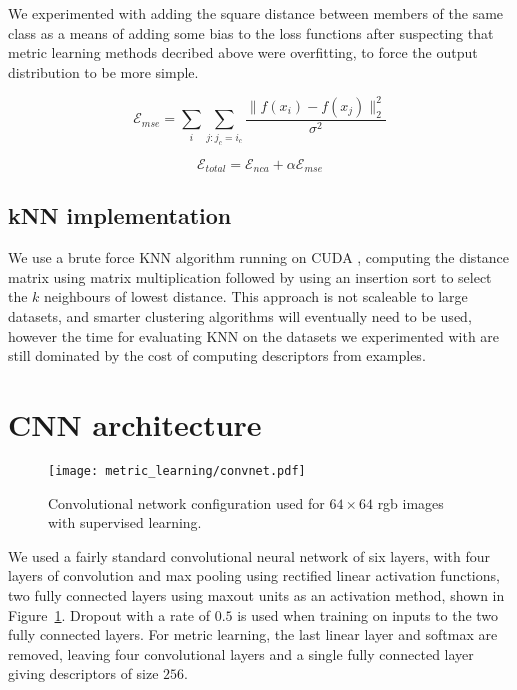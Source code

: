 We experimented with adding the square distance between members of the same class as a means of adding some bias to the loss functions after suspecting that metric learning methods decribed above were overfitting, to force the output distribution to be more simple. 

\begin{equation}
\label{eqn:mse}
\mathcal{E}_{mse} = \sum_i{ \sum_{j:j_c = i_c}  \frac {{\lVert f(x_i) - f(x_j) \rVert^2_2}} {\sigma^2} }
\end{equation}

\begin{equation}
\label{eqn:mse_total}
\mathcal{E}_{total} =  \mathcal{E}_{nca} + \alpha \mathcal{E}_{mse}
\end{equation}


\subsection {kNN implementation}

We use a brute force \gls{KNN} algorithm running on CUDA \cite{Garcia2008}, computing the distance matrix using matrix multiplication followed by using an insertion sort to select the $ k $ neighbours of lowest distance. This approach is not scaleable to large datasets, and smarter clustering algorithms will eventually need to be used, however the time for evaluating \gls{KNN} on the datasets we experimented with are still dominated by the cost of computing descriptors from examples. 


\section {CNN architecture}


\begin{figure}[ht]
\centering
\texttt{[image: metric\_learning/convnet.pdf]}
\caption{Convolutional network configuration used for $64\times64$ rgb images with supervised learning.}
\label{fig:convnet}
\end{figure}

We used a fairly standard convolutional neural network of six layers, with four layers of convolution and max pooling using rectified linear activation functions, two fully connected layers using maxout \cite{Springenberg2013} units as an activation method, shown in Figure~\ref{fig:convnet}. Dropout \cite{HintonDropout} with a rate of $ 0.5 $ is used when training on inputs to the two fully connected layers. For metric learning, the last linear layer and softmax are removed, leaving four convolutional layers and a single fully connected layer giving descriptors of size $ 256 $.


